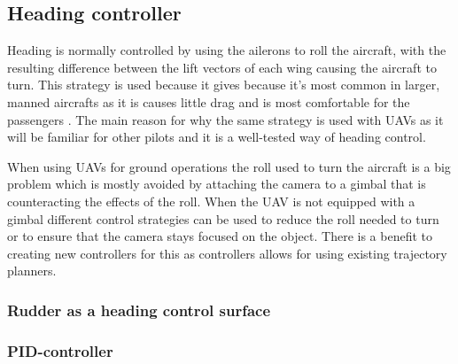 \subsection{Heading controller}
Heading is normally controlled by using the ailerons to roll the aircraft, with the resulting difference between the lift vectors of each wing causing the aircraft to turn. This strategy is used because it gives because it's most common in larger, manned aircrafts as it is causes little drag and is most comfortable for the passengers \cite{skidToTurnMills}. The main reason for why the same strategy is used with UAVs as it will be familiar for other pilots and it is a well-tested way of heading control.

When using UAVs for ground operations the roll used to turn the aircraft is a big problem which is mostly avoided by attaching the camera to a gimbal that is counteracting the effects of the roll. When the UAV is not equipped with a gimbal different control strategies can be used to reduce the roll needed to turn or to ensure that the camera stays focused on the object. There is a benefit to creating new controllers for this as controllers allows for using existing trajectory planners.


\subsubsection{Rudder as a heading control surface}

\subsubsection{PID-controller}